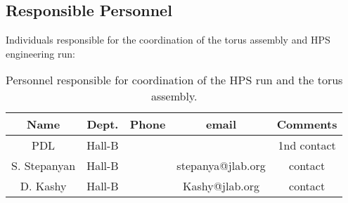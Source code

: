 \subsection{Responsible Personnel}
\indent

Individuals responsible for the coordination of the torus assembly and HPS engineering run:

\begin{table}[!htb]
 \centering
 \begin{tabular}{|c|c|c|c|c|}
\hline
 Name&Dept.&Phone&email&Comments \\ \hline
PDL & Hall-B&&&1nd contact \\ \hline
S. Stepanyan & Hall-B&&stepanya@jlab.org&contact \\ \hline
D. Kashy & Hall-B&&Kashy@jlab.org&contact \\ \hline
 \end{tabular}
\caption{ Personnel responsible for coordination of the HPS run and the torus assembly.} 
\label{tb:beam}
\end{table}

